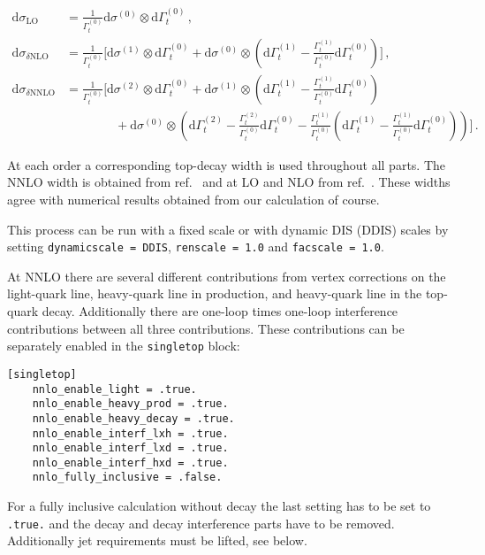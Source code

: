 \[\begin{aligned}
\mathrm{d}\sigma_\text{LO} & = \frac{1}{\Gamma_t^{(0)}} 
\mathrm{d}\sigma^{(0)}\otimes\mathrm{d}\Gamma_t^{(0)} \,,\\
\mathrm{d}\sigma_{\delta \text{NLO}} & = \frac{1}{\Gamma_t^{(0)}} \Bigg[ 
\mathrm{d}\sigma^{(1)}\otimes\mathrm{d}\Gamma_t^{(0)} + 
\mathrm{d}\sigma^{(0)}\otimes\left(\mathrm{d}\Gamma_t^{(1)} 
- \frac{\Gamma_t^{(1)}}{\Gamma_t^{(0)}} \mathrm{d}\Gamma_t^{(0)}  \right)
\Bigg] \,,\\
\mathrm{d}\sigma_{\delta \text{NNLO}} & = \frac{1}{\Gamma_t^{(0)}} \Bigg[
\mathrm{d}\sigma^{(2)}\otimes\mathrm{d}\Gamma_t^{(0)} + 
\mathrm{d}\sigma^{(1)}\otimes\left(
\mathrm{d}\Gamma_t^{(1)} - 
\frac{\Gamma_t^{(1)}}{\Gamma_t^{(0)}}\mathrm{d}\Gamma_t^{(0)}
\right) \\
& \qquad\qquad  + \mathrm{d}\sigma^{(0)}\otimes \left(
\mathrm{d}\Gamma_t^{(2)} - 
\frac{\Gamma_t^{(2)}}{\Gamma_t^{(0)}}\mathrm{d}\Gamma_t^{(0)}
-\frac{\Gamma_t^{(1)}}{\Gamma_t^{(0)}} \left(
\mathrm{d}\Gamma_t^{(1)} - \frac{\Gamma_t^{(1)}}{\Gamma_t^{(0)}}
\mathrm{d}\Gamma_t^{(0)}
\right)
\right) \Bigg] \,.
\end{aligned}\]

At each order a corresponding top-decay width is used throughout all
parts. The NNLO width is obtained from ref.~\cite{Blokland:2005vq} and at
LO and NLO from ref.~\cite{Czarnecki:1990kv}. These widths agree with
numerical results obtained from our calculation of course.

This process can be run with a fixed scale or with dynamic DIS (DDIS)
scales by setting \texttt{dynamicscale\ =\ DDIS},
\texttt{renscale\ =\ 1.0} and \texttt{facscale\ =\ 1.0}.

At NNLO there are several different contributions from vertex
corrections on the light-quark line, heavy-quark line in production, and
heavy-quark line in the top-quark decay. Additionally there are one-loop
times one-loop interference contributions between all three
contributions. These contributions can be separately enabled in the
\texttt{singletop} block:

\begin{verbatim}
[singletop]
    nnlo_enable_light = .true.
    nnlo_enable_heavy_prod = .true.
    nnlo_enable_heavy_decay = .true.
    nnlo_enable_interf_lxh = .true.
    nnlo_enable_interf_lxd = .true.
    nnlo_enable_interf_hxd = .true.
    nnlo_fully_inclusive = .false.
\end{verbatim}

For a fully inclusive calculation without decay the last setting has to
be set to \texttt{.true.} and the decay and decay interference parts
have to be removed. Additionally jet requirements must be lifted, see
below.

